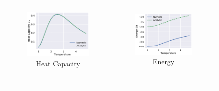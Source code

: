 \documentclass[aps,reprint]{revtex4-1}
\begin{document}
\begin{figure}
  \begin{tabular}{cc}
    \centering
    \begin{subfigure}[b]{0.5\columnwidth}
        \includegraphics[width=\columnwidth]{figures/4bHeatCapacity.eps}
        \caption{Heat Capacity}
        \label{fix1}
    \end{subfigure}&
    \begin{subfigure}[b]{0.5\columnwidth}
        \includegraphics[width=\columnwidth]{figures/4bEnergy.eps}
        \caption{Energy}
        \label{free1}
    \end{subfigure}\\
    \begin{subfigure}[b]{0.5\columnwidth}

\end{subfigure}
\end{tabular}
\end{figure}
\end{document}
